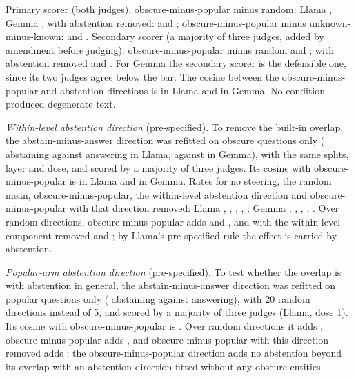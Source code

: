 \documentclass{article}
\begin{document}
Primary scorer (both judges), obscure-minus-popular minus random: Llama \svLlamaDOne{} \svLlamaDOneCI, Gemma \svGemmaDOne{} \svGemmaDOneCI; with abstention removed: \svLlamaDTwo{} \svLlamaDTwoCI{} and \svGemmaDTwo{} \svGemmaDTwoCI; obscure-minus-popular minus unknown-minus-known: \svLlamaDThree{} \svLlamaDThreeCI{} and \svGemmaDThree{} \svGemmaDThreeCI. Secondary scorer (a majority of three judges, added by amendment before judging): obscure-minus-popular minus random \svLlamaMajDOne{} \svLlamaMajDOneCI{} and \svGemmaMajDOne{} \svGemmaMajDOneCI; with abstention removed \svLlamaMajDTwo{} \svLlamaMajDTwoCI{} and \svGemmaMajDTwo{} \svGemmaMajDTwoCI. For Gemma the secondary scorer is the defensible one, since its two judges agree below the bar. The cosine between the obscure-minus-popular and abstention directions is \svLlamaCos{} in Llama and \svGemmaCos{} in Gemma. No condition produced degenerate text.

\emph{Within-level abstention direction} (pre-specified). To remove the built-in overlap, the abstain-minus-answer direction was refitted on obscure questions only (\wlLlamaHi{} abstaining against \wlLlamaLo{} answering in Llama, \wlGemmaHi{} against \wlGemmaLo{} in Gemma), with the same splits, layer and dose, and scored by a majority of three judges. Its cosine with obscure-minus-popular is \wlLlamaCos{} in Llama and \wlGemmaCos{} in Gemma. Rates for no steering, the random mean, obscure-minus-popular, the within-level abstention direction and obscure-minus-popular with that direction removed: Llama \wlLlamaNone, \wlLlamaRand, \wlLlamaFam, \wlLlamaAbst, \wlLlamaPerp; Gemma \wlGemmaNone, \wlGemmaRand, \wlGemmaFam, \wlGemmaAbst, \wlGemmaPerp. Over random directions, obscure-minus-popular adds \wlLlamaDOne{} \wlLlamaDOneCI{} and \wlGemmaDOne{} \wlGemmaDOneCI, and with the within-level component removed \wlLlamaDTwo{} \wlLlamaDTwoCI{} and \wlGemmaDTwo{} \wlGemmaDTwoCI; by Llama's pre-specified rule the effect is carried by abstention.

\emph{Popular-arm abstention direction} (pre-specified). To test whether the overlap is with abstention in general, the abstain-minus-answer direction was refitted on popular questions only (\gaHi{} abstaining against \gaLo{} answering), with 20 random directions instead of 5, and scored by a majority of three judges (Llama, dose 1). Its cosine with obscure-minus-popular is \gaCos. Over random directions it adds \gaAbst{} \gaAbstCI, obscure-minus-popular adds \gaFam{} \gaFamCI, and obscure-minus-popular with this direction removed adds \gaPerp{} \gaPerpCI: the obscure-minus-popular direction adds no abstention beyond its overlap with an abstention direction fitted without any obscure entities.
\end{document}

